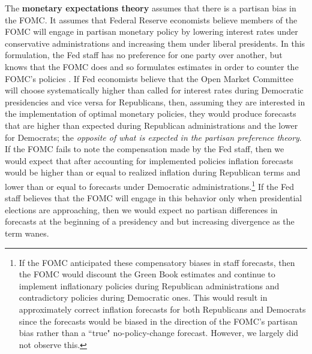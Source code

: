 \documentclass[a4paper]{article}
\begin{document}
The {\bf{monetary expectations theory}} assumes that there is a partisan bias in the FOMC. It assumes that Federal Reserve economists believe members of the FOMC will engage in partisan monetary policy by lowering interest rates under conservative administrations and increasing them under liberal presidents. In this formulation, the Fed staff has no preference for one party over another, but knows that the FOMC does and so formulates estimates in order to counter the FOMC's policies \citep{Clark2012}. If Fed economists believe that the Open Market Committee will choose systematically higher than called for interest rates during Democratic presidencies and vice versa for Republicans, then, assuming they are interested in the implementation of optimal monetary policies, they would produce forecasts that are higher than expected during Republican administrations and the lower for Democrats; the {\emph{opposite of what is expected in the partisan preference theory}}. If the FOMC fails to note the compensation made by the Fed staff, then we would expect that after accounting for implemented policies inflation forecasts would be higher than or equal to realized inflation during Republican terms and lower than or equal to forecasts under Democratic administrations.\footnote{If the FOMC anticipated these compensatory biases in staff forecasts, then the FOMC would discount the Green Book estimates and continue to implement inflationary policies during Republican administrations and contradictory policies during Democratic ones. This would result in approximately correct inflation forecasts for both Republicans and Democrats since the forecasts would be biased in the direction of the FOMC's partisan bias rather than a ``true" no-policy-change forecast. However, we largely did not observe this.} If the Fed staff believes that the FOMC will engage in this behavior only when presidential elections are approaching, then we would expect no partisan differences in forecasts at the beginning of a presidency and but increasing divergence as the term wanes.%
 
\end{document}
